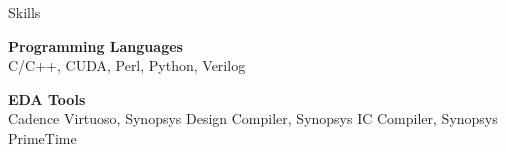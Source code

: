 
\begin{rSection}{Skills}

{\bf Programming Languages} \\
C/C++, CUDA, Perl, Python, Verilog 


{\bf EDA Tools} \\
Cadence Virtuoso, Synopsys Design Compiler, Synopsys IC Compiler, Synopsys PrimeTime 

\end{rSection}
